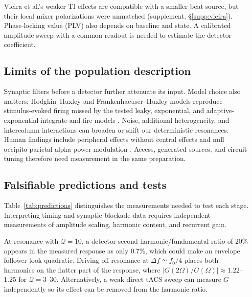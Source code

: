 Vieira et al.'s weaker TI effects \cite{vieira2024} are compatible with a
smaller beat source, but their local mixer polarizations were unmatched
(supplement, \S\ref{supp:vieira}). Phase-locking value (PLV) also depends on
baseline and state. A calibrated amplitude sweep with a common readout is
needed to estimate the detector coefficient.

\subsection{Limits of the population description}
Synaptic filters before a detector further attenuate its input. Model choice
also matters: Hodgkin--Huxley and Frankenhaeuser--Huxley models reproduce
stimulus-evoked firing missed by the tested leaky, exponential, and
adaptive-exponential integrate-and-fire models \cite{plovie2025}.
Noise, additional heterogeneity, and intercolumn interactions can broaden or
shift our deterministic resonances. Human findings include peripheral effects
without central effects \cite{iszak2023} and null occipito-parietal alpha-power
modulation \cite{mansourinezhad2025}. Access, generated sources, and circuit
tuning therefore need measurement in the same preparation.

\subsection{Falsifiable predictions and tests}\label{sec:predictions}
Table~\ref{tab:predictions} distinguishes the measurements needed to test each
stage. Interpreting timing and synaptic-blockade data requires independent
measurements of amplitude scaling, harmonic content, and recurrent gain.

At resonance with $\mathcal Q=10$, a detector second-harmonic/fundamental ratio of $20\%$ appears in the measured response as only $0.7\%$, which could make an envelope follower look quadratic. Driving off resonance at $\Delta f\simeq f_0/4$ places both harmonics on the flatter part of the response, where $|G(2\Omega)/G(\Omega)|\approx1.22$--$1.25$ for $\mathcal Q=3$--$30$. Alternatively, a weak direct tACS sweep can measure $G$ independently so its effect can be removed from the harmonic ratio.

